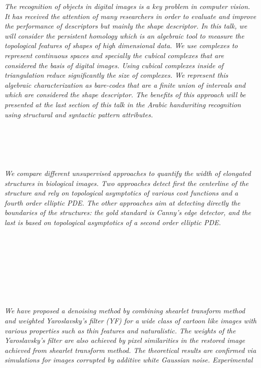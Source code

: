   \begin{multicols}{2}
      \textit{The recognition of objects in digital images is a  key problem  in computer vision. It has received the attention of many researchers  in order to evaluate and improve the performance of descriptors but mainly the shape descriptor.
		In this talk, we will consider the persistent homology which is an algebraic tool to measure the topological features of shapes of high dimensional data. We use complexes to represent continuous spaces and specially the cubical complexes that are considered the basis of digital images. Using cubical complexes inside of triangulation  reduce significantly the size of complexes. We represent this algebraic characterization as bare-codes that are a finite union of intervals and which are considered the shape descriptor. The benefits of this approach will be presented at the last section of this talk in the Arabic handwriting recognition using structural and syntactic pattern attributes.}\\
\\ 
        \\
        \\\\
\\
      \textit{We compare different unsupervised approaches to quantify the width of elongated structures in biological images. Two approaches detect first the centerline of the structure and rely on topological asymptotics of various cost functions and a fourth order elliptic PDE. The other approaches aim at detecting directly the boundaries of the structures: the gold standard is Canny's edge detector, and the last is based on topological asymptotics of a second order elliptic PDE.}\\
\\ 
        \\
        \\\\
        \\
        \\\\
\\
      \textit{We have proposed a denoising method by combining shearlet transform method  and  weighted  Yaroslavsky’s  filter  (YF)  for  a  wide  class  of  cartoon  like images with various properties such as thin features and naturalistic. The weights of the Yaroslavsky’s filter are also achieved by pixel similarities in the restored image achieved from shearlet transform method. The theoretical results are confirmed via simulations for images corrupted by additive white Gaussian noise. Experimental 
}
\end{multicols}
